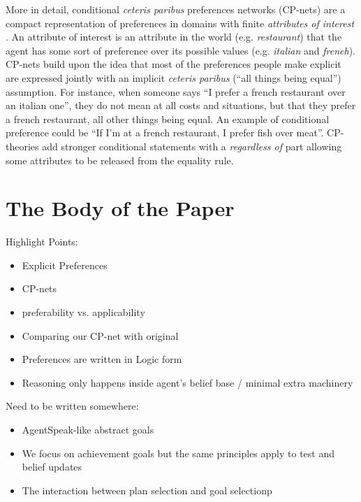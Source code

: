 \documentclass[sigconf,anonymous]{aamas}
\begin{document}
More in detail, conditional \textit{ceteris paribus}  preferences networks (CP-nets) are a compact representation of preferences in domains with finite \textit{attributes of interest} \cite{Boutilier2004}. An attribute of interest is an attribute in the world (e.g. \textit{restaurant}) that the agent has some sort of preference over its possible values (e.g. \textit{italian} and \textit{french}). CP-nets build upon the idea that most of the preferences people make explicit are expressed jointly with an implicit \textit{ceteris paribus} (``all things being equal'') assumption. For instance, when someone says ``I prefer a french restaurant over an italian one'', they do not mean at all costs and situations, but that they prefer a french restaurant, all other things being equal. An example of conditional preference could be ``If I'm at a french restaurant, I prefer fish over meat''. CP-theories \cite{Wilson2004} add stronger conditional statements with a \textit{regardless of} part allowing some attributes to be released from the equality rule.



\section{The Body of the Paper}

Highlight Points:
\begin{itemize}
    \item Explicit Preferences
    \item CP-nets
    \item preferability vs. applicability
    \item Comparing our CP-net with original
    \item Preferences are written in Logic form
    \item Reasoning only happens inside agent's belief base / minimal extra machinery
\end{itemize}

Need to be written somewhere:
\begin{itemize}
    \item AgentSpeak-like abstract goals
    \item We focus on achievement goals but the same principles apply to test and belief updates
    \item The interaction between plan selection and goal selectionp
\end{itemize}
\end{document}
